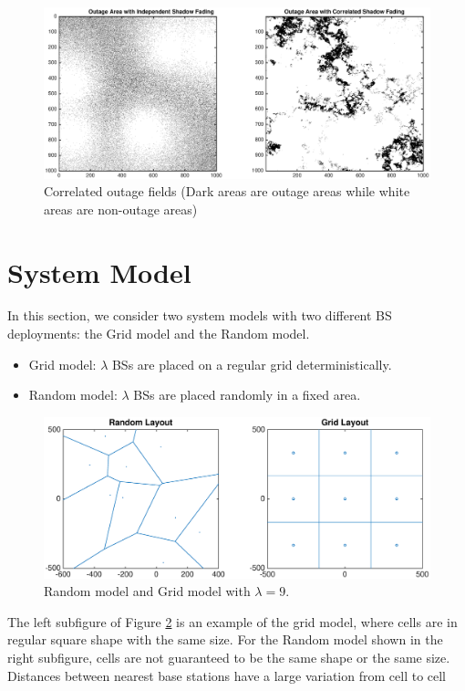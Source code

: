  \begin{figure}
 \centering
 \includegraphics[width=14cm]{outageArea.eps}
 \caption{Correlated outage fields (Dark areas are outage areas while white areas are non-outage areas)}
 \label{4:outagefie}
 \end{figure}


 \section{System Model}
 \label{4:SystemModel}
 In this section, we consider two system models with two different BS deployments: the Grid model and the Random model.
 \begin{itemize}
 \item Grid model: $\lambda$ BSs are placed on a regular grid deterministically.
 \item Random model: $\lambda$ BSs are placed randomly in a fixed area.
 \end{itemize}
 \begin{figure}
 \centering
 \includegraphics[width=14cm]{systemLayout.eps}
 \caption{Random model and Grid model with $\lambda = 9$.}
 \label{4:RandomLayout}
 \end{figure}
 The left subfigure of Figure \ref{4:RandomLayout} is an example of the grid model, where cells are in regular square shape with the same size. For the Random model shown in the right subfigure, cells are not guaranteed to be the same shape or the same size. Distances between nearest base stations have a large variation from cell to cell



